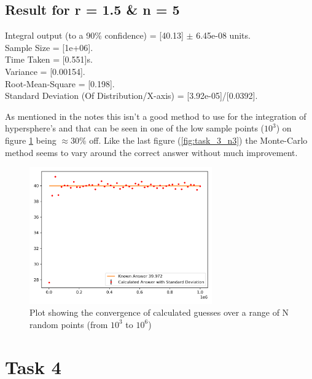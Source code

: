 \documentclass[12pt, A4]{article}
\begin{document}

\subsection{Result for r = 1.5 \& n = 5} %
\label{sub:Result for r = 1.5}

Integral output (to a 90\% confidence) = [40.13] $\pm$  6.45e-08 units.
\\
Sample Size = [1e+06].
\\
Time Taken = [0.551]s.
\\
Variance = [0.00154].
\\
Root-Mean-Square = [0.198].
\\
Standard Deviation (Of Distribution/X-axis) = [3.92e-05]/[0.0392]. 

\vspace{1em} 

As mentioned in the notes this isn't a good method to use for the integration 
of hypersphere's and that can be seen in one of the low sample points ($10^3$) on 
figure \ref{fig:task_3_n5} being $\approx 30\%$ off. Like the last figure (\ref{fig:task_3_n3}) 
the Monte-Carlo method seems to vary around the correct answer without much improvement.

\begin{figure}[H]
  \begin{center}
    \includegraphics[width=0.7\textwidth]{task_3_n5.png}
  \end{center}
  \caption{Plot showing the convergence of calculated guesses over a range of N random points (from $10^3$ to $10^6$)}
  \label{fig:task_3_n5}
\end{figure}


\section{Task 4} %
\label{sec:Task 4}
\end{document}
